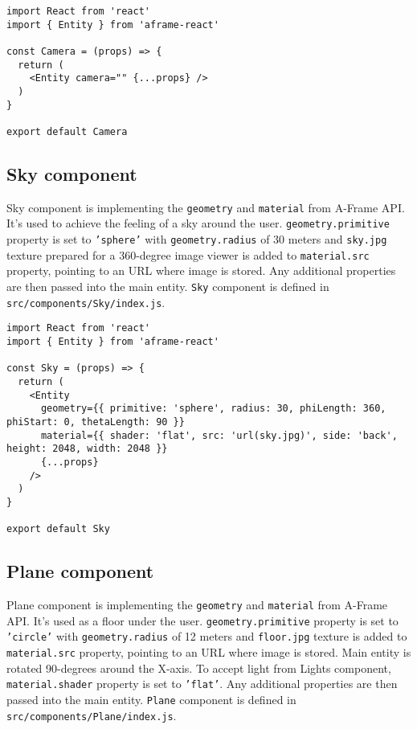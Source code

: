 \begin{lstlisting}[caption={\textsl{Camera} component code.},captionpos=b]
import React from 'react'
import { Entity } from 'aframe-react'

const Camera = (props) => {
  return (
    <Entity camera="" {...props} />
  )
}

export default Camera
\end{lstlisting}

\subsection{Sky component}
Sky component is implementing the \texttt{geometry} and \texttt{material} from A-Frame API. It's used to achieve the feeling of a sky around the user. \texttt{geometry.primitive} property is set to \texttt{'sphere'} with \texttt{geometry.radius} of 30 meters and \texttt{sky.jpg} texture prepared for a 360-degree image viewer is added to \texttt{material.src} property, pointing to an URL where image is stored. Any additional properties are then passed into the main entity. \texttt{Sky} component is defined in \texttt{src/components/Sky/index.js}.

\begin{lstlisting}[caption={\textsl{Sky} component code.},captionpos=b]
import React from 'react'
import { Entity } from 'aframe-react'

const Sky = (props) => {
  return (
    <Entity
      geometry={{ primitive: 'sphere', radius: 30, phiLength: 360, phiStart: 0, thetaLength: 90 }}
      material={{ shader: 'flat', src: 'url(sky.jpg)', side: 'back', height: 2048, width: 2048 }}
      {...props}
    />
  )
}

export default Sky
\end{lstlisting}

\subsection{Plane component}
Plane component is implementing the \texttt{geometry} and \texttt{material} from A-Frame API. It's used as a floor under the user. \texttt{geometry.primitive} property is set to \texttt{'circle'} with \texttt{geometry.radius} of 12 meters and \texttt{floor.jpg} texture is added to \texttt{material.src} property, pointing to an URL where image is stored. Main entity is rotated 90-degrees around the X-axis. To accept light from Lights component, \texttt{material.shader} property is set to \texttt{'flat'}. Any additional properties are then passed into the main entity. \texttt{Plane} component is defined in \texttt{src/components/Plane/index.js}.

